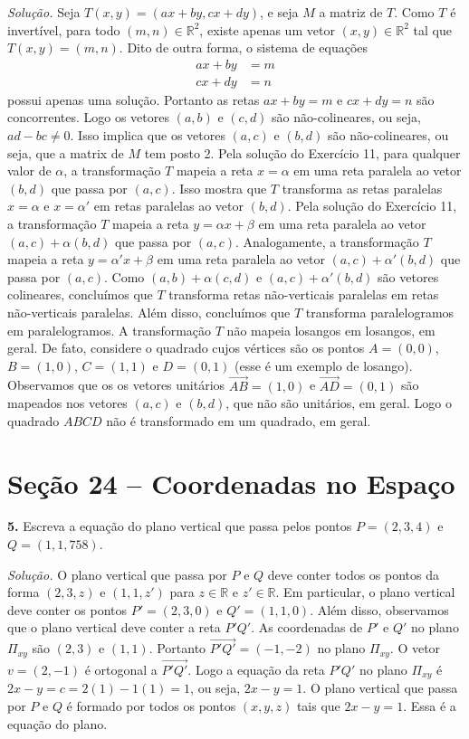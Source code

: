 \documentclass[a4paper,11pt]{article}
\newcommand{\R}{\mathbb{R}}
\begin{document}
\emph{Solução.}
Seja $T(x,y) = (ax + by, cx + dy)$, e seja $M$ a matriz de $T$.
Como $T$ é invertível, para todo $(m,n) \in \R^2$, existe apenas um vetor $(x,y) \in \R^2$ tal que $T(x,y) = (m,n)$.
Dito de outra forma, o sistema de equações
\begin{align*}
  ax + by & = m \\
  cx + dy & = n
\end{align*}
possui apenas uma solução.
Portanto as retas $ax + by = m$ e $cx + dy = n$ são concorrentes.
Logo os vetores $(a,b)$ e $(c,d)$ são não-colineares, ou seja, $ad - bc \neq 0$.
Isso implica que os vetores $(a,c)$ e $(b,d)$ são não-colineares, ou seja, que a matrix de $M$ tem posto 2.
Pela solução do Exercício 11, para qualquer valor de $\alpha$, a transformação $T$ mapeia a reta $x = \alpha$ em uma reta paralela ao vetor $(b,d)$ que passa por $(a,c)$.
Isso mostra que $T$ transforma as retas paralelas $x = \alpha$ e $x = \alpha'$ em retas paralelas ao vetor $(b,d)$.
Pela solução do Exercício 11, a transformação $T$ mapeia a reta $y = \alpha x + \beta$ em uma reta paralela ao vetor $(a,c) + \alpha(b,d)$ que passa por $(a,c)$.
Analogamente, a transformação $T$ mapeia a reta $y = \alpha' x + \beta$ em uma reta paralela ao vetor $(a,c) + \alpha'(b,d)$ que passa por $(a,c)$.
Como $(a,b) + \alpha(c,d)$ e $(a,c) + \alpha'(b,d)$ são vetores colineares, concluímos que $T$ transforma retas não-verticais paralelas em retas não-verticais paralelas.
Além disso, concluímos que $T$ transforma paralelogramos em paralelogramos.
A transformação $T$ não mapeia losangos em losangos, em geral.
De fato, considere o quadrado cujos vértices são os pontos $A = (0,0)$, $B = (1,0)$, $C = (1,1)$ e $D = (0,1)$ (esse é um exemplo de losango).
Observamos que os os vetores unitários $\overrightarrow{AB} = (1,0)$ e $\overrightarrow{AD} = (0,1)$ são mapeados nos vetores $(a,c)$ e $(b,d)$, que não são unitários, em geral.
Logo o quadrado $ABCD$ não é transformado em um quadrado, em geral.

\section*{Seção 24 -- Coordenadas no Espaço}

\textbf{5.}
Escreva a equação do plano vertical que passa pelos pontos $P = (2,3,4)$ e $Q = (1,1,758)$.

\vspace{\baselineskip}

\emph{Solução.}
O plano vertical que passa por $P$ e $Q$ deve conter todos os pontos da forma $(2,3,z)$ e $(1,1,z')$ para $z \in \R$ e $z' \in \R$.
Em particular, o plano vertical deve conter os pontos $P' = (2,3,0)$ e $Q' = (1,1,0)$.
Além disso, observamos que o plano vertical deve conter a reta $P'Q'$.
As coordenadas de $P'$ e $Q'$ no plano $\Pi_{xy}$ são $(2,3)$ e $(1,1)$.
Portanto $\overrightarrow{P'Q'} = (-1,-2)$ no plano $\Pi_{xy}$.
O vetor $v = (2,-1)$ é ortogonal a $\overrightarrow{P'Q'}$.
Logo a equação da reta $P'Q'$ no plano $\Pi_{xy}$ é $2x - y = c = 2(1) - 1(1) = 1$, ou seja, $2x - y = 1$.
O plano vertical que passa por $P$ e $Q$ é formado por todos os pontos $(x,y,z)$ tais que $2x - y = 1$.
Essa é a equação do plano.
\end{document}
